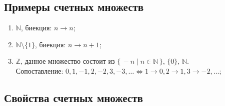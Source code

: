 \documentclass[12pt]{article}
\theoremstyle{definition}
\begin{document}
\subsection*{Примеры счетных множеств}
\begin{enumerate}
	\item $\mathbb{N}$, биекция: $n \rightarrow n$;
	\item $\mathbb{N}\setminus \{1\}$, биекция: $n \rightarrow n+1$;
	\item $\mathbb{Z}$, данное множество состоит из $\{\,-n \mid n \in \mathbb{N} \,\},\, \{0\},\, \mathbb{N}$.\\ Сопоставление: $0,1,-1,2,-2,3,-3, \dotsc \Leftrightarrow 1\rightarrow 0, 2 \rightarrow 1, 3 \rightarrow -2, \dotsc$;
\end{enumerate}

\subsection*{Свойства счетных множеств}
\end{document}
